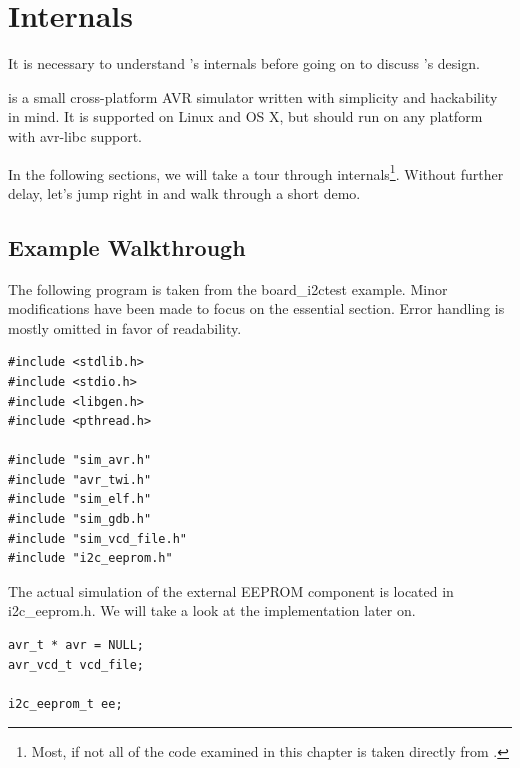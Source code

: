 
\chapter{\simavr Internals} \label{chapter:simavr}

It is necessary to understand \simavr's internals before going on to discuss
\qsimavr's design.

\simavr is a small cross-platform \ac{AVR} simulator written with simplicity and
hackability in mind. It is supported on Linux and OS X, but should run on any
platform with avr-libc support.

In the following sections, we will take a tour through \simavr internals\footnote{
Most, if not all of the code examined in this chapter is taken directly from \simavr.}.
Without further delay, let's jump right in and walk through a short demo.


\section{\simavr Example Walkthrough} \label{section:simavr_example_walkthrough}

The following program is taken from the board\_i2ctest \simavr example. Minor
modifications have been made to focus on the essential section. Error handling
is mostly omitted in favor of readability.

\begin{lstlisting}
#include <stdlib.h>
#include <stdio.h>
#include <libgen.h>
#include <pthread.h>

#include "sim_avr.h"
#include "avr_twi.h"
#include "sim_elf.h"
#include "sim_gdb.h"
#include "sim_vcd_file.h"
#include "i2c_eeprom.h"
\end{lstlisting}

The actual simulation of the external \ac{EEPROM} component is located in
i2c\_eeprom.h. We will take a look at the implementation later on.

\begin{lstlisting}
avr_t * avr = NULL;
avr_vcd_t vcd_file;

i2c_eeprom_t ee;
\end{lstlisting}

